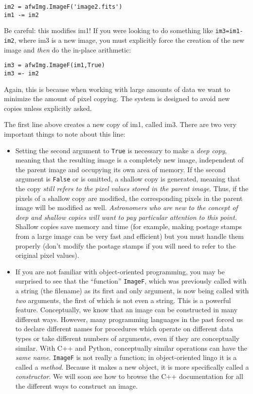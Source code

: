 \documentclass{book}
\begin{document}
\begin{verbatim}
im2 = afwImg.ImageF('image2.fits')
im1 -= im2
\end{verbatim}

Be careful: this modifies im1!  If you were looking to do something
like \texttt{im3=im1-im2}, where im3 is a new image, you must
explicitly force the creation of the new image and {\it then} do the
in-place arithmetic:

\begin{verbatim}
im3 = afwImg.ImageF(im1,True)
im3 =- im2
\end{verbatim}

Again, this is because when working with large amounts of data we want
to minimize the amount of pixel copying.  The system is designed to
avoid new copies unless explicitly asked.

The first line above creates a new copy of im1, called im3.  There are
two very important things to note about this line:

\begin{itemize}

\item Setting the second argument to \texttt{True} is necessary to
  make a {\it deep copy}, meaning that the resulting image is a
  completely new image, independent of the parent image and occupying
  its own area of memory.  If the second argument is \texttt{False} or
  is omitted, a shallow copy is generated, meaning that the copy {\it
    still refers to the pixel values stored in the parent image}.
  Thus, if the pixels of a shallow copy are modified, the
  corresponding pixels in the parent image will be modified as well.
  {\it Astronomers who are new to the concept of deep and shallow
    copies will want to pay particular attention to this point.}
  Shallow copies save memory and time (for example, making postage
  stamps from a large image can be very fast and efficient) but you
  must handle them properly (don't modify the postage stamps if you
  will need to refer to the original pixel values).

\item If you are not familiar with object-oriented programming, you
  may be surprised to see that the ``function'' \texttt{ImageF}, which
  was previously called with a string (the filename) as its first and
  only argument, is now being called with {\it two} arguments, the
  first of which is not even a string.  This is a powerful
  feature. Conceptually, we know that an image can be constructed in
  many different ways.  However, many programming languages in the
  past forced us to declare different names for procedures which
  operate on different data types or take different numbers of
  arguments, even if they are conceptually similar.  With C++ and
  Python, conceptually similar operations can have the {\it same
    name}.  \texttt{ImageF} is not really a function; in
  object-oriented lingo it is a called a {\it method}.  Because it
  makes a new object, it is more specifically called a {\it
    constructor}.  We will soon see how to browse the C++
  documentation for all the different ways to construct an image.

\end{itemize}
\end{document}
